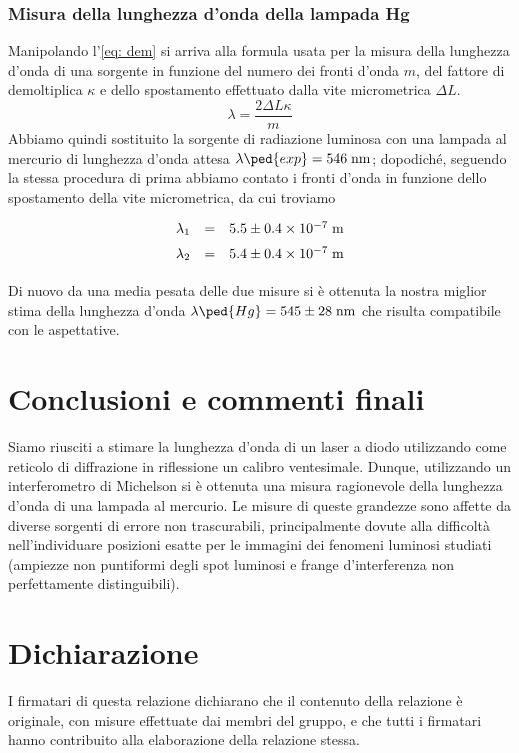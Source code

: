 \documentclass[10pt, a4paper, italian]{article}
\begin{document}
\subsubsection{Misura della lunghezza d'onda della lampada Hg}
Manipolando l'\cref{eq: dem} si arriva alla formula usata per la misura della
lunghezza d'onda di una sorgente in funzione del numero dei fronti
d'onda $m$, del fattore di demoltiplica $\kappa$ e dello spostamento effettuato
dalla vite micrometrica $\Delta L$.
\[
\lambda = \frac{2 \Delta L \kappa}{m}
\]
Abbiamo quindi sostituito la sorgente di radiazione luminosa con una lampada
al mercurio di lunghezza d'onda attesa $\lambda\ped{exp} = 546 \; \si{n\m}$;
dopodiché, seguendo la stessa procedura di prima abbiamo contato i fronti
d'onda in funzione dello spostamento della vite micrometrica, da cui troviamo
\[
\def\arraystretch{1.5}
\begin{array}{rcl}
\lambda_1 & = & 5.5 \pm 0.4 \times 10^{-7} \; \si{m} \\
\lambda_2 & = & 5.4 \pm 0.4 \times 10^{-7} \; \si{m} \\
\end{array}
\]

Di nuovo da una media pesata delle due misure si è ottenuta la nostra miglior
stima della lunghezza d'onda $\lambda\ped{Hg} = 545 \pm 28 \; \si{n\m}$ che
risulta compatibile con le aspettative.

\section*{Conclusioni e commenti finali}
Siamo riusciti a stimare la lunghezza d'onda di un laser a diodo utilizzando
come reticolo di diffrazione in riflessione un calibro ventesimale.
Dunque, utilizzando un interferometro di Michelson si è ottenuta una misura
ragionevole della lunghezza d'onda di una lampada al mercurio.
Le misure di queste grandezze sono affette da diverse sorgenti di errore non
trascurabili, principalmente dovute alla difficoltà nell'individuare posizioni
esatte per le immagini dei fenomeni luminosi studiati (ampiezze non puntiformi
degli spot luminosi e frange d'interferenza non perfettamente distinguibili).

\section*{Dichiarazione}
I firmatari di questa relazione dichiarano che il contenuto della relazione \`e
originale, con misure effettuate dai membri del gruppo, e che tutti i firmatari
hanno contribuito alla elaborazione della relazione stessa.
\end{document}
